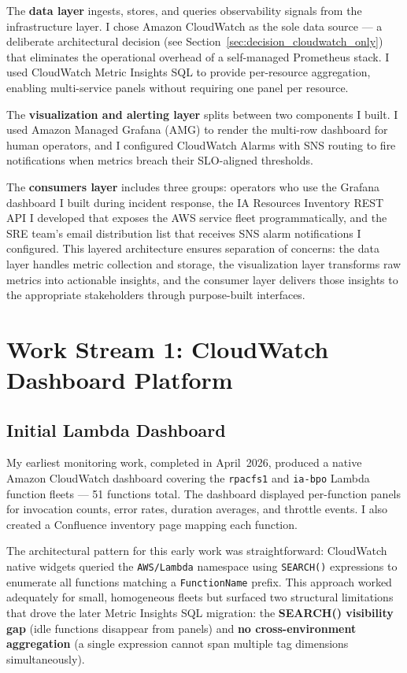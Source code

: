 The \textbf{data layer} ingests, stores, and queries observability signals
from the infrastructure layer. I chose Amazon CloudWatch as the sole data source ---
a deliberate architectural decision (see Section~\ref{sec:decision_cloudwatch_only})
that eliminates the operational overhead of a self-managed Prometheus stack.
I used CloudWatch Metric Insights SQL to provide per-resource aggregation, enabling
multi-service panels without requiring one panel per resource.

The \textbf{visualization and alerting layer} splits between two components I built.
I used Amazon Managed Grafana (AMG) to render the multi-row dashboard for human operators,
and I configured CloudWatch Alarms with SNS routing to fire notifications when metrics breach
their SLO-aligned thresholds.

The \textbf{consumers layer} includes three groups: operators who use the
Grafana dashboard I built during incident response, the IA Resources Inventory REST
API I developed that exposes the AWS service fleet programmatically, and the SRE team's
email distribution list that receives SNS alarm notifications I configured. This layered architecture ensures separation of concerns: the data layer handles metric collection and storage, the visualization layer transforms raw metrics into actionable insights, and the consumer layer delivers those insights to the appropriate stakeholders through purpose-built interfaces.


\FloatBarrier

\section{Work Stream 1: CloudWatch Dashboard Platform}
\label{sec:cw_dashboard_platform}


\subsection{Initial Lambda Dashboard}

My earliest monitoring work, completed in April~2026, produced a native
Amazon CloudWatch dashboard covering the \texttt{rpacfs1} and
\texttt{ia-bpo} Lambda function fleets --- 51 functions total. The dashboard
displayed per-function panels for invocation counts, error rates, duration
averages, and throttle events. I also created a Confluence inventory page
mapping each function.

The architectural pattern for this early work was straightforward:
CloudWatch native widgets queried the \texttt{AWS/Lambda} namespace using
\texttt{SEARCH()} expressions to enumerate all functions matching a
\texttt{FunctionName} prefix. This approach worked adequately for small,
homogeneous fleets but surfaced two structural limitations that drove
the later Metric Insights SQL migration: the \textbf{SEARCH() visibility
gap} (idle functions disappear from panels) and \textbf{no cross-environment
aggregation} (a single expression cannot span multiple tag dimensions
simultaneously).

